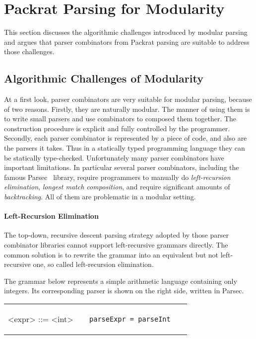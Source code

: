 \section{Packrat Parsing for Modularity}\label{sec:packrat}

This section discusses the algorithmic challenges introduced by modular parsing and argues that parser combinators from Packrat parsing
are suitable to address those challenges.

\subsection{Algorithmic Challenges of Modularity}
At a first look, parser combinators are very suitable for modular parsing, because of two reasons. Firstly, they are naturally modular. The manner of using them is to write small parsers and use combinators to composed them together. The construction procedure is explicit and fully controlled by the programmer. Secondly, each parser combinator is represented by a piece of code, and also are the parsers it takes. Thus in a statically typed programming language they can be statically type-checked.
Unfortunately many parser combinators have important limitations.
In particular several parser combinators,
including the famous Parsec~\cite{Leijen2001} library, require
programmers to manually do \textit{left-recursion elimination}, \textit{longest match composition}, and
require significant amounts of \textit{backtracking}. All of them are
problematic in a modular setting.

\paragraph{Left-Recursion Elimination} The top-down, recursive descent parsing strategy adopted by those parser combinator libraries cannot support left-recursive grammars directly. The common solution is to rewrite the grammar into an equivalent but not left-recursive one, so called left-recursion elimination.

The grammar below represents a simple arithmetic language containing only integers. Its corresponding parser is shown on the right side, written in Parsec.

\begin{tabular}{m{0.4\linewidth}m{0.5\linewidth}}
\setlength{\grammarindent}{5em}
\begin{grammar}
<expr> ::= <int>
\end{grammar}
&
\begin{lstlisting}[language=PlainCode]
parseExpr = parseInt
\end{lstlisting}
\end{tabular}

